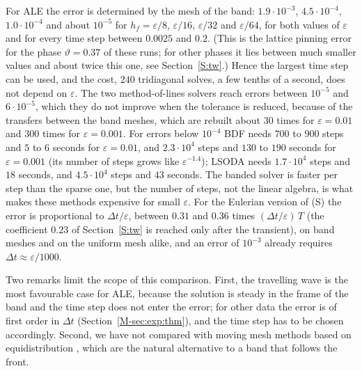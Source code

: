\documentclass[11pt]{amsart}
\theoremstyle{definition}
\theoremstyle{remark}
\newcommand{\ve}{\varepsilon}
\begin{document}
For ALE the error is determined by the mesh of the band: $1.9\cdot10^{-3}$, $4.5\cdot10^{-4}$,
$1.0\cdot10^{-4}$ and about $10^{-5}$ for $h_f=\ve/8$, $\ve/16$, $\ve/32$ and $\ve/64$, for both values
of $\ve$ and for every time step between $0.0025$ and $0.2$. (This is the lattice pinning
error for the phase $\vartheta=0.37$ of these runs; for other phases it lies between much
smaller values and about twice this one, see Section~\ref{S:tw}.) Hence the largest
time step can be used, and the cost, $240$
tridiagonal solves, a few tenths of a second, does not depend on $\ve$. The two
method-of-lines solvers reach errors between $10^{-5}$ and $6\cdot10^{-5}$, which they do not
improve when the tolerance is reduced, because of the transfers between the band
meshes, which are rebuilt about $30$ times for $\ve=0.01$ and $300$ times for $\ve=0.001$. For
errors below $10^{-4}$ BDF needs $700$ to $900$ steps and $5$ to $6$ seconds for $\ve=0.01$, and
$2.3\cdot10^4$ steps and $130$ to $190$ seconds for $\ve=0.001$ (its number of steps grows like
$\ve^{-1.4}$); LSODA needs $1.7\cdot10^4$ steps and $18$ seconds, and $4.5\cdot10^4$ steps and
$43$ seconds. The banded solver is
faster per step than the sparse one, but the number of steps, not the linear algebra, is
what makes these methods expensive for small $\ve$. For the Eulerian version of (S) the
error is proportional to $\Delta t/\ve$, between $0.31$ and $0.36$ times $(\Delta t/\ve)\,T$ (the
coefficient $0.23$ of Section~\ref{S:tw} is reached only after the transient), on
band meshes and on the uniform mesh alike, and an error of $10^{-3}$ already requires
$\Delta t\approx\ve/1000$.

Two remarks limit the scope of this comparison. First, the travelling wave is the most
favourable case for ALE, because the solution is steady in the frame of the band and the
time step does not enter the error; for other data the error is of first order in
$\Delta t$ (Section~\ref{M-sec:exp:thm}), and the time step has to be chosen accordingly.
Second, we have not compared with moving mesh methods based on equidistribution
\cite{HuangRussell2011}, which are the natural alternative to a band that follows the
front.




\end{document}
